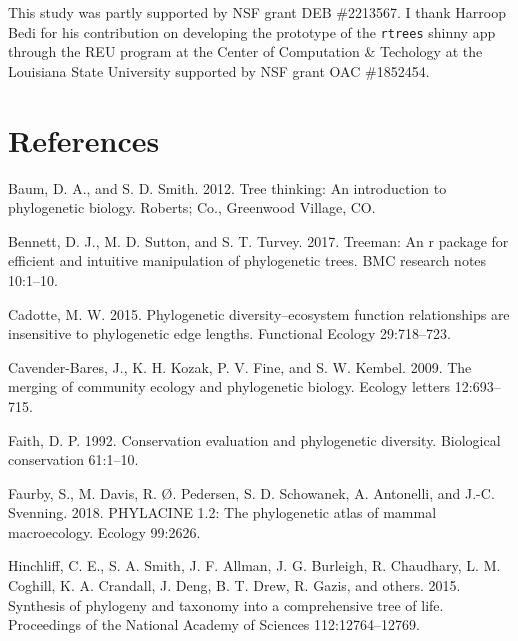 \documentclass[
  12pt,
]{article}
\newlength{\cslhangindent}
\newlength{\cslentryspacingunit} %
\newenvironment{CSLReferences}[2] %
 {%
  \setlength{\parindent}{0pt}
  \ifodd #1
  \let\oldpar\par
  \def\par{\hangindent=\cslhangindent\oldpar}
  \fi
  \setlength{\parskip}{#2\cslentryspacingunit}
 }%
 {}
\begin{document}
This study was partly supported by NSF grant DEB \#2213567. I thank Harroop Bedi for his contribution on developing the prototype of the \texttt{rtrees} shinny app through the REU program at the Center of Computation \& Techology at the Louisiana State University supported by NSF grant OAC \#1852454.

\hypertarget{references}{%
\section*{References}\label{references}}

\hypertarget{refs}{}
\begin{CSLReferences}{1}{0}
\leavevmode{}%
Baum, D. A., and S. D. Smith. 2012. Tree thinking: An introduction to phylogenetic biology. Roberts; Co., Greenwood Village, CO.

\leavevmode{}%
Bennett, D. J., M. D. Sutton, and S. T. Turvey. 2017. Treeman: An r package for efficient and intuitive manipulation of phylogenetic trees. BMC research notes 10:1--10.

\leavevmode{}%
Cadotte, M. W. 2015. Phylogenetic diversity--ecosystem function relationships are insensitive to phylogenetic edge lengths. Functional Ecology 29:718--723.

\leavevmode{}%
Cavender-Bares, J., K. H. Kozak, P. V. Fine, and S. W. Kembel. 2009. The merging of community ecology and phylogenetic biology. Ecology letters 12:693--715.

\leavevmode{}%
Faith, D. P. 1992. Conservation evaluation and phylogenetic diversity. Biological conservation 61:1--10.

\leavevmode{}%
Faurby, S., M. Davis, R. Ø. Pedersen, S. D. Schowanek, A. Antonelli, and J.-C. Svenning. 2018. PHYLACINE 1.2: The phylogenetic atlas of mammal macroecology. Ecology 99:2626.

\leavevmode{}%
Hinchliff, C. E., S. A. Smith, J. F. Allman, J. G. Burleigh, R. Chaudhary, L. M. Coghill, K. A. Crandall, J. Deng, B. T. Drew, R. Gazis, and others. 2015. Synthesis of phylogeny and taxonomy into a comprehensive tree of life. Proceedings of the National Academy of Sciences 112:12764--12769.


\end{CSLReferences}
\end{document}
